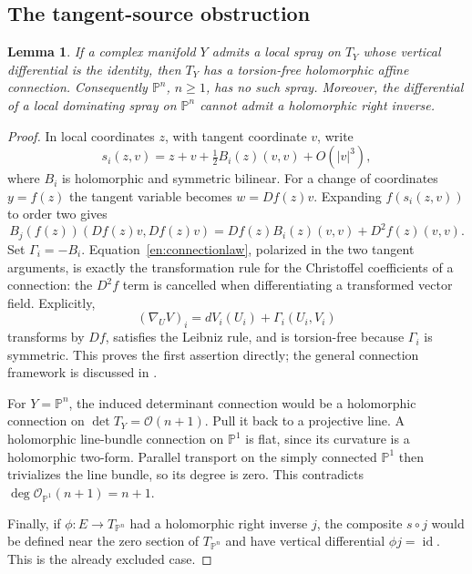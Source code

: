 \documentclass[12pt]{amsart}
\newtheorem{lem}[thm]{Lemma}
\theoremstyle{definition}
\theoremstyle{remark}
\numberwithin{equation}{section}
\newcommand{\cO}{\mathcal{O}}
\DeclareMathOperator{\id}{id}
\newcommand{\mP}{\mathbb{P}}
\begin{document}
\subsection{The tangent-source obstruction}
\begin{lem}\label{en:connection}
If a complex manifold $Y$ admits a local spray on $T_Y$ whose vertical differential is the identity, then $T_Y$ has a torsion-free holomorphic affine connection. Consequently $\mP^n$, $n\geq1$, has no such spray. Moreover, the differential of a local dominating spray on $\mP^n$ cannot admit a holomorphic right inverse.
\end{lem}
\begin{proof}
In local coordinates $z$, with tangent coordinate $v$, write
\[
s_i(z,v)=z+v+\tfrac12 B_i(z)(v,v)+O(|v|^3),
\]
where $B_i$ is holomorphic and symmetric bilinear. For a change of coordinates $y=f(z)$ the tangent variable becomes $w=Df(z)v$. Expanding $f(s_i(z,v))$ to order two gives
\begin{equation}\label{en:connectionlaw}
B_j(f(z))(Df(z)v,Df(z)v)
=Df(z)B_i(z)(v,v)+D^2f(z)(v,v).
\end{equation}
Set $\Gamma_i=-B_i$. Equation~\eqref{en:connectionlaw}, polarized in the two tangent arguments, is exactly the transformation rule for the Christoffel coefficients of a connection: the $D^2f$ term is cancelled when differentiating a transformed vector field. Explicitly,
\[
(\nabla_U V)_i=dV_i(U_i)+\Gamma_i(U_i,V_i)
\]
transforms by $Df$, satisfies the Leibniz rule, and is torsion-free because $\Gamma_i$ is symmetric. This proves the first assertion directly; the general connection framework is discussed in \cite{en:Atiyah}.

For $Y=\mP^n$, the induced determinant connection would be a holomorphic connection on $\det T_Y=\cO(n+1)$. Pull it back to a projective line. A holomorphic line-bundle connection on $\mP^1$ is flat, since its curvature is a holomorphic two-form. Parallel transport on the simply connected $\mP^1$ then trivializes the line bundle, so its degree is zero. This contradicts $\deg\cO_{\mP^1}(n+1)=n+1$.

Finally, if $\phi:E\to T_{\mP^n}$ had a holomorphic right inverse $j$, the composite $s\circ j$ would be defined near the zero section of $T_{\mP^n}$ and have vertical differential $\phi j=\id$. This is the already excluded case.
\end{proof}
\end{document}

